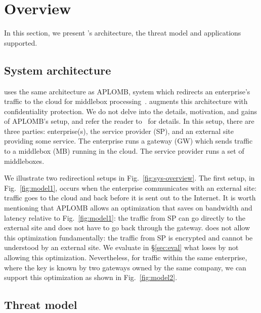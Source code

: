 


     
\section{Overview}\label{sec:overview}








In this section, we present \sys's architecture, the threat model and applications supported.


\subsection{System architecture}

\sys uses the same  architecture as APLOMB, system which redirects an enterprise's traffic to the cloud for middlebox processing~\cite{aplomb}. \sys augments this architecture with confidentiality protection.
We do not delve into the details, motivation, and gains of APLOMB's setup, and refer the reader to~\cite{aplomb} for details. 
In this setup, there are three parties: enterprise(s), the service provider (SP), and an external site providing
some service. The enterprise runs a gateway (GW) which sends traffic to a middlebox (MB) running in the cloud.
The service provider runs a set of middleboxes. 

We illustrate two redirectionl setups in Fig.~\ref{fig:sys-overview}.  The first setup, in Fig.~\ref{fig:model1},  occurs when the enterprise communicates with an external site: traffic goes to the cloud and back before it is sent out to the Internet. 
It is worth mentioning that APLOMB allows an optimization that saves on bandwidth and latency relative to Fig.~\ref{fig:model1}: the traffic from SP can go directly to the external site and does not have to go back through the gateway. \sys does not allow this optimization fundamentally: the traffic from SP is encrypted and cannot be understood by an external site. We evaluate in \S\ref{sec:eval} what \sys loses by not allowing this optimization. 
Nevertheless, for traffic within the same enterprise, where the key is known by two gateways owned by the same company, we can support this optimization as shown in Fig.~\ref{fig:model2}.



\subsection{Threat model}

